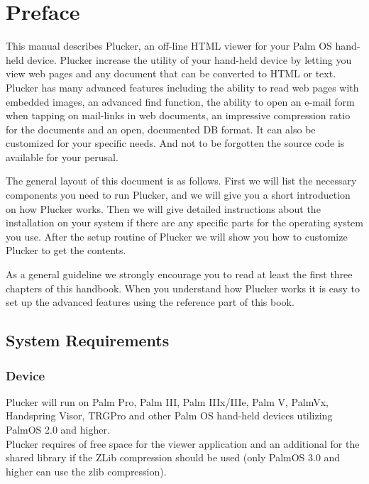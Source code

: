 %
%
\chapter{Preface}

This manual describes Plucker, an off-line HTML viewer for your Palm OS
hand-held device. Plucker increase the utility of your hand-held device
by letting you view web pages and any document that can be converted to
HTML or text. Plucker has many advanced features including the ability
to read web pages with embedded images, an advanced find function, the
ability to open an e-mail form when tapping on mail-links in web
documents, an impressive compression ratio for the documents and an open,
documented DB format. It can also be customized for your specific needs.
And not to be forgotten the source code is available for your perusal.

The general layout of this document is as follows. First we will list
the necessary components you need to run Plucker, and we will give you
a short introduction on how Plucker works. Then we will give detailed
instructions about the installation on your system if there are any
specific parts for the operating system you use. After the setup
routine of Plucker we will show you how to customize Plucker to get
the contents.

As a general guideline we strongly encourage you to read at least the
first three chapters of this handbook. When you understand how Plucker
works it is easy to set up the advanced features using the reference
part of this book.

\section{System Requirements}

\subsection{Device}

Plucker will run on Palm Pro, Palm III, Palm IIIx/IIIe,
Palm V, PalmVx, Handspring Visor, TRGPro and other Palm OS
hand-held devices utilizing PalmOS 2.0 and higher.\\

Plucker requires \viewerram{} of free space for the viewer application
and an additional \libram{} for the shared library if the ZLib
compression should be used (only PalmOS 3.0 and higher can use the
zlib compression).\\

